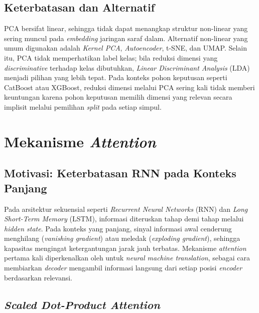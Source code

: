 \subsection{Keterbatasan dan Alternatif}

PCA bersifat linear, sehingga tidak dapat menangkap struktur non-linear yang sering muncul pada \textit{embedding} jaringan saraf dalam. Alternatif non-linear yang umum digunakan adalah \textit{Kernel PCA}, \textit{Autoencoder}, t-SNE, dan UMAP. Selain itu, PCA tidak memperhatikan label kelas; bila reduksi dimensi yang \textit{discriminative} terhadap kelas dibutuhkan, \textit{Linear Discriminant Analysis} (LDA) menjadi pilihan yang lebih tepat. Pada konteks pohon keputusan seperti CatBoost atau XGBoost, reduksi dimensi melalui PCA sering kali tidak memberi keuntungan karena pohon keputusan memilih dimensi yang relevan secara implisit melalui pemilihan \textit{split} pada setiap simpul.

\section{Mekanisme \textit{Attention}}
\label{sec:attention}

\subsection{Motivasi: Keterbatasan RNN pada Konteks Panjang}

Pada arsitektur sekuensial seperti \textit{Recurrent Neural Networks} (RNN) dan \textit{Long Short-Term Memory} (LSTM), informasi diteruskan tahap demi tahap melalui \textit{hidden state}. Pada konteks yang panjang, sinyal informasi awal cenderung menghilang (\textit{vanishing gradient}) atau meledak (\textit{exploding gradient}), sehingga kapasitas mengingat ketergantungan jarak jauh terbatas. Mekanisme \textit{attention} pertama kali diperkenalkan oleh \citet{bahdanauAttention2015} untuk \textit{neural machine translation}, sebagai cara membiarkan \textit{decoder} mengambil informasi langsung dari setiap posisi \textit{encoder} berdasarkan relevansi.

\subsection{\textit{Scaled Dot-Product Attention}}

